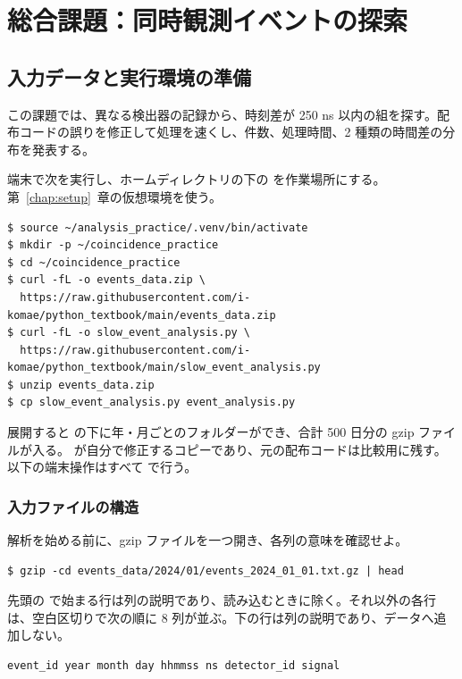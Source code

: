 \chapter{総合課題：同時観測イベントの探索}
\label{chap:kadai}
\section{入力データと実行環境の準備}

この課題では、異なる検出器の記録から、時刻差が 250 ns 以内の組を探す。配布コードの誤りを修正して処理を速くし、件数、処理時間、2 種類の時間差の分布を発表する。

端末で次を実行し、ホームディレクトリの下の  を作業場所にする。第~\ref{chap:setup}~章の仮想環境を使う。

\begin{lstlisting}[numbers=none, xleftmargin=2\zw]
$ source ~/analysis_practice/.venv/bin/activate
$ mkdir -p ~/coincidence_practice
$ cd ~/coincidence_practice
$ curl -fL -o events_data.zip \
  https://raw.githubusercontent.com/i-komae/python_textbook/main/events_data.zip
$ curl -fL -o slow_event_analysis.py \
  https://raw.githubusercontent.com/i-komae/python_textbook/main/slow_event_analysis.py
$ unzip events_data.zip
$ cp slow_event_analysis.py event_analysis.py
\end{lstlisting}

展開すると  の下に年・月ごとのフォルダーができ、合計 500 日分の gzip ファイルが入る。 が自分で修正するコピーであり、元の配布コードは比較用に残す。以下の端末操作はすべて  で行う。

\subsection{入力ファイルの構造}

解析を始める前に、gzip ファイルを一つ開き、各列の意味を確認せよ。

\begin{lstlisting}[numbers=none, xleftmargin=2\zw]
$ gzip -cd events_data/2024/01/events_2024_01_01.txt.gz | head
\end{lstlisting}

先頭の \code{\#} で始まる行は列の説明であり、読み込むときに除く。それ以外の各行は、空白区切りで次の順に 8 列が並ぶ。下の行は列の説明であり、データへ追加しない。

\begin{lstlisting}[numbers=none, xleftmargin=2\zw]
event_id year month day hhmmss ns detector_id signal
\end{lstlisting}

